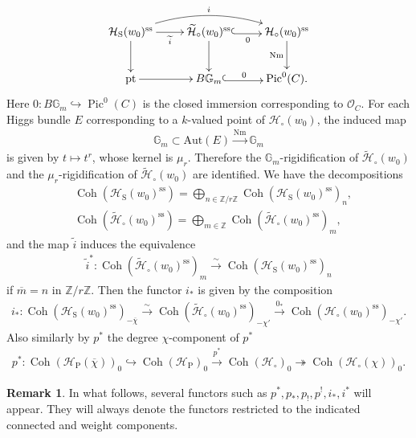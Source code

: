 \documentclass[11pt,oneside,a4paper,mathscr]{amsart}
\makeatletter
\theoremstyle{definition}
\newtheorem{remark}[thm]{Remark}
\newcommand{\Pic}{\operatorname{Pic}}
\newcommand{\cH}{\mathcal{H}}
\newcommand{\cO}{\mathcal{O}}
\newcommand{\bgm}{B\mathbb{G}_m}
\newcommand{\Coh}{\operatorname{Coh}}
\newcommand{\rS}{\mathrm{S}}
\newcommand{\inclusion}{\ar@<-0.3ex>@{^{(}->}[r]}
\makeatother
\begin{document}
\begin{align}\label{factor:i}
    \xymatrix{
\cH_{\rS}(w_0)^{\mathrm{ss}} \ar[r]_-{\widetilde{i}} \ar@/^15pt/[rr]^-{i} \ar[d] & \widetilde{\cH}_{\circ}(w_0)^{\mathrm{ss}} \ar[d] \inclusion_-{0} & \cH_{\circ}(w_0)^{\mathrm{ss}} \ar[d]_-{\mathrm{Nm}} \\
\mathrm{pt} \ar[r]& \bgm \inclusion^-{0}  & \mathrm{Pic}^0(C).
    }
\end{align}
Here
$0 \colon \bgm \hookrightarrow \Pic^0(C)$ is the closed immersion corresponding to $\cO_C$. 
For each Higgs bundle $E$ corresponding to a $k$-valued point of $\cH_{\circ}(w_0)$, the induced map 
\begin{align*}
    \mathbb{G}_m \subset \mathrm{Aut}(E) \stackrel{\mathrm{Nm}}{\to}
   \mathbb{G}_m
\end{align*}
is given by $t\mapsto t^r$, whose kernel is $\mu_r$. 
Therefore the $\mathbb{G}_m$-rigidification of $\widetilde{\cH}_{\circ}(w_0)$
and the $\mu_r$-rigidification of $\widetilde{\cH}_{\circ}(w_0)$ are identified. 
We have the decompositions 
\begin{align*}
&\Coh(\cH_{\rS}(w_0)^{\mathrm{ss}} )=\bigoplus_{n\in \mathbb{Z}/r\mathbb{Z}}
\Coh(\cH_{\rS}(w_0)^{\mathrm{ss}} )_{n}, \\ 
&\Coh(\widetilde{\cH}_{\circ}(w_0)^{\mathrm{ss}} )=\bigoplus_{m\in \mathbb{Z}}\Coh(\widetilde{\cH}_{\circ}(w_0)^{\mathrm{ss}})_m,
\end{align*}
and the map $\widetilde{i}$ induces the equivalence 
\begin{align*}
    \widetilde{i}^* \colon \Coh(\widetilde{\cH}_{\circ}(w_0)^{\mathrm{ss}})_m
    \stackrel{\sim}{\to}\Coh(\cH_{\rS}(w_0)^{\mathrm{ss}} )_{n}
\end{align*}
if $\overline{m}=n$ in $\mathbb{Z}/r\mathbb{Z}$. 
Then the functor $i_{*}$ is given by the composition 
\begin{align}\label{compose:0i}
    i_{*} \colon \Coh(\cH_{\rS}(w_0)^{\mathrm{ss}})_{-\overline{\chi}} \stackrel{\sim}{\to} \Coh(\widetilde{\cH}_{\circ}(w_0)^{\mathrm{ss}})_{-\chi'}
    \stackrel{0_{*}}{\to} \Coh(\cH_{\circ}(w_0)^{\mathrm{ss}})_{-\chi'}.
\end{align}
Also  
similarly by $p^*$ the degree $\chi$-component of $p^*$ 
\begin{align*}
    p^* \colon \Coh(\cH_{\mathrm{P}}(\overline{\chi}))_{0} \hookrightarrow 
    \Coh(\cH_{\mathrm{P}})_{0} \stackrel{p^*}{\to}
    \Coh(\cH_{\circ})_0 \twoheadrightarrow 
    \Coh(\cH_{\circ}(\chi))_0.
\end{align*}
\begin{remark}
    In what follows, several functors such as $p^*,p_*,p_!,p^!, i_{*}, i^*$ will appear. They will always denote the functors restricted to the indicated connected and weight components.
\end{remark}
\end{document}

